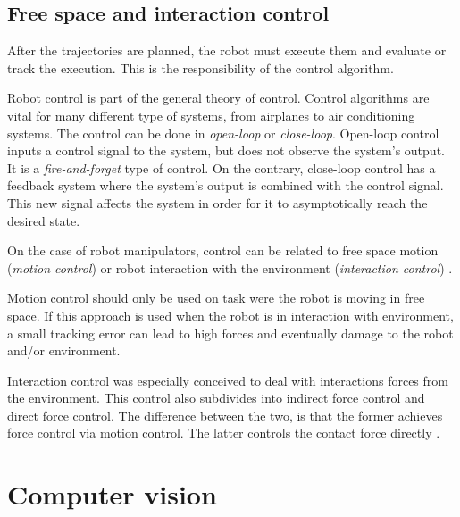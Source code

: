 

\subsection{Free space and interaction control}
\label{subsec:free_space_interaction_control}

After the trajectories are planned, the robot must execute them and evaluate or track the execution. This is the responsibility of the control algorithm.

Robot control is part of the general theory of control. Control algorithms are vital for many different type of systems, from airplanes to air conditioning systems. The control can be done in \emph{open-loop} or \emph{close-loop}. Open-loop control inputs a control signal to the system, but does not observe the system's output. It is a \emph{fire-and-forget} type of control. On the contrary, close-loop control has a feedback system where the system's output is combined with the control signal. This new signal affects the system in order for it to asymptotically reach the desired state.  

On the case of robot manipulators, control can be related to free space motion (\emph{motion control}) or robot interaction with the environment (\emph{interaction control}) \cite{Siciliano1999_robot_force_control}. 

Motion control should only be used on task were the robot is moving in free space. If this approach is used when the robot is in interaction with environment, a small tracking error can lead to high forces and eventually damage to the robot and/or environment. 

Interaction control was especially conceived to deal with interactions forces from the environment. This control also subdivides into {indirect force control} and {direct force control}. The difference between the two, is that the former achieves force control via motion control. The latter controls the contact force directly \cite{Siciliano1999_robot_force_control}.




\section{Computer vision}
\label{sec:computer_vision}

